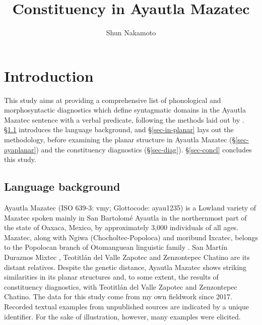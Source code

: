 \documentclass[output=paper]{langscibook}
\author{Shun Nakamoto\affiliation{Universidad Nacional Autónoma de México}}
\title{Constituency in Ayautla Mazatec}
\begin{document}
\maketitle

\section{Introduction}
This study aims at providing a comprehensive list of phonological and morphosyntactic diagnostics which define syntagmatic domains in the Ayautla Mazatec sentence with a verbal predicate, %
following the methods laid out by \citet{tallman20beyond,tallman2021constituency}.
\S\ref{sec-in-lg} introduces the language background, and \S\ref{sec-in-planar} lays out the methodology, before examining the planar structure in Ayautla Mazatec (\S\ref{sec-ayaplanar}) and the constituency diagnostics (\S\ref{sec-diag}). \S\ref{sec-concl} concludes this study.

\subsection{Language background}\label{sec-in-lg}
Ayautla Mazatec (ISO 639-3: vmy; Glottocode: ayau1235) is a Lowland variety of Mazatec spoken mainly in San Bartolomé Ayautla in the northernmost part of the state of Oaxaca, Mexico, by approximately 3,000 individuals of all ages.
Mazatec, along with Ngiwa (Chocholtec-Popoloca) and moribund Ixcatec, belongs to the Popolocan branch of Otomanguean linguistic family  \citep{fdm51,gud58,hamp58,hamp60}.
San Martín Duraznos Mixtec ,
Teotitlán del Valle Zapotec  and
Zenzontepec Chatino  are its distant relatives. Despite the genetic distance, Ayautla Mazatec shows striking similarities in its planar structures and, to some extent, the results of constituency diagnostics, with Teotitlán del Valle Zapotec and Zenzontepec Chatino.
The data for this study come from my own fieldwork since 2017. Recorded textual examples from unpublished sources are indicated by a unique identifier. For the sake of illustration, however, many examples were elicited.
\end{document}
